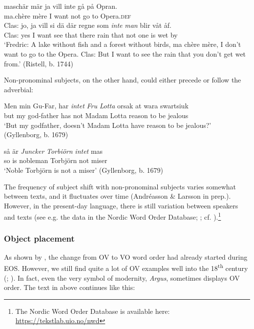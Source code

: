 \documentclass[output=paper]{langscibook}
\begin{document}
\gll  maschär   mär ja   vill   inte  gå   på Opran.\\
 ma.chère   mère I   want not  go   to Opera\textsc{.def}\\

\gll Clas: jo,   ja   vill   si     dä   där   regne   som \textit{inte} \textit{man} blir   våt   åf. \\
    Clas: yes   I   want   see   that   there   rain     that   not   one   is     wet   by\\

\glt `Fredric: A lake without fish and a forest without birds, ma chère mère, I don’t want to go to the Opera. Clas: But I want to see the rain that you don’t get wet from.’ (Ristell, b. 1744)
\z
\z

Non-pronominal subjects, on the other hand, could either precede or follow the adverbial:


\ea
\ea
\gll  Men   min Gu-Far,       har \textit{intet} \textit{Fru} \textit{Lotta} orsak   at   wara swartsiuk \\
but   my   god-father   has   not   Madam Lotta reason to be   jealous\\

\glt ‘But my godfather, doesn’t Madam Lotta have reason to be jealous?’ (Gyllenborg, b. 1679)

\ex
\gll  så   är \textit{Juncker} \textit{Torbiörn} \textit{intet} mas \\
    so is    nobleman    Torbjörn  not    miser\\
    \glt ‘Noble Torbjörn is not a miser’ (Gyllenborg, b. 1679)
\z
\z


The frequency of subject shift with non-pronominal subjects varies somewhat between texts, and it fluctuates over time (Andréasson \& Larsson in prep.). However, in the present-day language, there is still variation between speakers and texts (see e.g. the data in the Nordic Word Order Database; \citealt{LundquistEtAl2019}; cf. \citealt{Andreasson2007}).\footnote{The Nordic Word Order Database is available here: \url{https://tekstlab.uio.no/nwd}} 


\subsubsection{Object placement}\label{sec:intro:3.2.2}


As shown by \citet{Delsing1999}, the change from OV to VO word order had already started during EOS. However, we still find quite a lot of OV examples well into the 18\textsuperscript{th} century (\citealt{Petzell2011}; \citealt{Sangfelt2019}). In fact, even the very symbol of modernity, \textit{Argus}, sometimes displays OV order. The text in  above continues like this:
\end{document}
